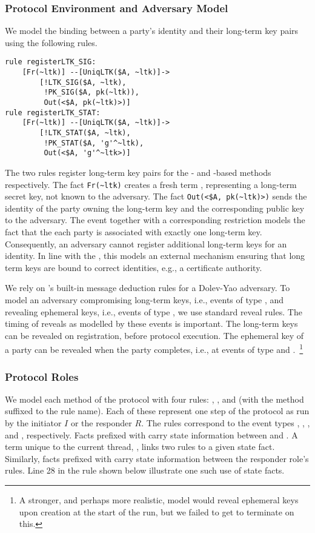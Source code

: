 \subsubsection{Protocol Environment and Adversary Model}
We model the binding between a party's identity and their long-term
key pairs using the following rules.
%
\begin{small}
\begin{verbatim}
rule registerLTK_SIG:
    [Fr(~ltk)] --[UniqLTK($A, ~ltk)]->
        [!LTK_SIG($A, ~ltk),
         !PK_SIG($A, pk(~ltk)),
         Out(<$A, pk(~ltk)>)]
rule registerLTK_STAT:
    [Fr(~ltk)] --[UniqLTK($A, ~ltk)]->
        [!LTK_STAT($A, ~ltk),
         !PK_STAT($A, 'g'^~ltk),
         Out(<$A, 'g'^~ltk>)]
\end{verbatim}
\end{small}
%
The two rules register long-term
key pairs for the \mSig{}- and \mStat{}-based methods respectively.
%
The fact \verb|Fr(~ltk)| creates a fresh term , representing a long-term
secret key, not known to the adversary.
%
The fact \verb|Out(<$A, pk(~ltk)>)| sends the identity of the party
owning the long-term key and the corresponding public key to the adversary.
%
The event  together with a corresponding restriction models the fact
that the each party is associated with exactly one long-term key.
%
Consequently, an adversary cannot register additional long-term keys for an
identity.
%
In line with the \mEdhoc{} \mSpec{}, this models an external mechanism
ensuring that long term keys are bound to correct identities, e.g.,
a certificate authority.
%

We rely on \mTamarin's{} built-in message deduction rules for a Dolev-Yao adversary.
%
To model an adversary compromising long-term keys, i.e., events of type
\mRevLTK{}, and revealing ephemeral keys, i.e., events of type
\mRevEph{}, we use standard reveal rules.
%
The timing of reveals as modelled by these events is important.
%
The long-term keys can be revealed on registration, before protocol execution.
%
The ephemeral key of a party can be revealed when the party completes,
i.e., at events of type \mIComplete{} and \mRComplete.~\footnote{A stronger, and perhaps more realistic, model would reveal ephemeral keys upon
creation at the start of the run, but we failed to get \mTamarin{} to
terminate on this.}
%

\subsubsection{Protocol Roles}
We model each method of the protocol with four rules: , , 
and  (with the method suffixed to the rule name).
%
Each of these represent one step of the protocol as run by the initiator $I$
or the responder $R$.
%
The rules correspond to the event types \mIStart, \mRStart, \mIComplete,  and
\mRComplete, respectively.
%
Facts prefixed with  carry state information between  and .
%
A term unique to the current thread, , links two rules to a given state fact.
%
Similarly, facts prefixed with  carry state information between the
responder role's rules.
%
Line 28 in the  rule shown below illustrate one such use of state
facts.
%

